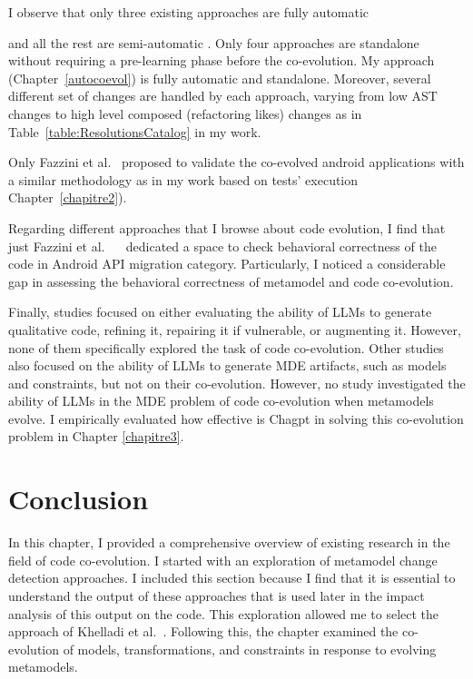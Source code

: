   I observe that only three existing approaches are fully automatic {\cite{10.1145/3387905.3388608,10.1145/3597503.3639084,8813263} and all the rest are semi-automatic \cite{9079197,10.5555/2486788.2486855,6062100,dagenais2011recommending,5070565,henkel2005catchup,10.1145/1932682.1869486,10.1145/3194793.3194798,Khelladi2020}. Only four approaches are standalone without requiring a pre-learning phase before the co-evolution.
   My approach (Chapter~\ref{autocoevol}) is fully automatic and standalone. Moreover, several different set of changes are handled by each approach, varying from low AST changes to high level composed (refactoring likes) changes as in Table~\ref{table:ResolutionsCatalog} in my work. 
   
    Only Fazzini et al.~\cite{10.1145/3387905.3388608} proposed to validate the co-evolved android applications with a similar methodology as in my work based on tests' execution Chapter~\ref{chapitre2}). 
  
 Regarding different approaches that I browse about code evolution, I find that just Fazzini et al.~ ~\cite{10.1145/3387905.3388608} dedicated a space to check behavioral correctness of the code in Android API migration category. Particularly, I noticed a considerable gap in assessing the behavioral correctness of metamodel and code co-evolution.
  
  Finally, studies focused on either evaluating the ability of LLMs to generate qualitative code, refining it, repairing it if vulnerable, or augmenting it. However, none of them specifically explored the task of code co-evolution.
  Other studies also focused on the ability of LLMs to generate MDE artifacts, such as models and constraints, but not on their co-evolution. However, no study investigated the ability of LLMs in the MDE problem of code co-evolution when metamodels evolve. I empirically evaluated how effective is Chagpt in solving this co-evolution problem in Chapter \ref{chapitre3}.
 
  \section{Conclusion}
In this chapter, I provided a comprehensive overview of existing research in the field of code co-evolution. I started with an exploration of metamodel change detection approaches. I included this section because I find that it is essential to understand the output of these approaches that is used later in the impact analysis of this output on the code. This exploration allowed me to select the approach of Khelladi et al.~\cite{khelladi2015detecting}. Following this, the chapter examined the co-evolution of models, transformations, and constraints in response to evolving metamodels.
  
}
